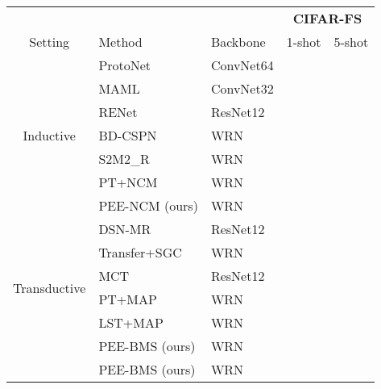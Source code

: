 \documentclass[review]{elsarticle}
\begin{document}
\begin{table}[h!]
{\begin{tabular}{c|l|l|l|l}
         \toprule
         &     &     & \multicolumn{2}{c}{\textbf{CIFAR-FS}} \\
         Setting & Method & Backbone & 1-shot & 5-shot \\
         \midrule
         \multirow{7}{*}{Inductive}
         &ProtoNet~\cite{snell2017prototypical} & ConvNet64 &  & \\
         &MAML~\cite{finn2017model} & ConvNet32 &  & \\
         &RENet\cite{DBLP:journals/corr/abs-2108-09666} & ResNet12 &  & \\
&BD-CSPN~\cite{liu2020prototype} & WRN &  & \\
         &S2M2\_R~\cite{mangla2020charting} & WRN &  & \\
         &PT+NCM~\cite{hu2021leveraging} & WRN &  & \\
         &PEE-NCM (ours) & WRN &  & \\
         \midrule
         \multirow{6}{*}{Transductive}
         &DSN-MR~\cite{simon2020adaptive} & ResNet12 &  & \\
         &Transfer+SGC~\cite{hu2021graph} & WRN &  & \\
         &MCT~\cite{DBLP:journals/corr/abs-2002-12017} & ResNet12 &  & \\
         &PT+MAP~\cite{hu2021leveraging} & WRN &  &  \\
         &LST+MAP~\cite{DBLP:journals/corr/abs-2102-05176} & WRN &  &  \\
         &PEE-BMS (ours) & WRN &  &  \\
         &PEE-BMS (ours) & WRN &  & \\
         \bottomrule
         
    \end{tabular}
    }
    \label{tab:results2}
\end{table}
\end{document}
